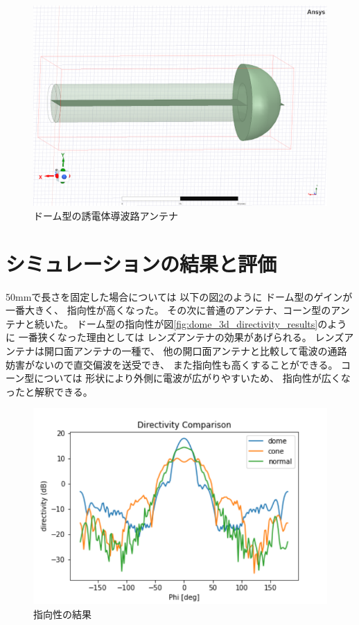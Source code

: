 \documentclass[technicalreport]{ieicej}
\begin{document}
\begin{figure}[tb]
  \begin{center}
    \includegraphics[bb=0 0 384 262, width=0.7\linewidth]{img/dome.pdf}
    \caption{ドーム型の誘電体導波路アンテナ}
    \label{fig:dome}
  \end{center}
\end{figure}

\section{シミュレーションの結果と評価}

50mmで長さを固定した場合については
以下の図\ref{fig:directivity_results}のように
ドーム型のゲインが一番大きく、
指向性が高くなった。
その次に普通のアンテナ、コーン型のアンテナと続いた。
ドーム型の指向性が図\ref{fig:dome_3d_directivity_results}のように
一番狭くなった理由としては
レンズアンテナの効果があげられる。
レンズアンテナは開口面アンテナの一種で、
他の開口面アンテナと比較して電波の通路妨害がないので直交偏波を送受でき、
また指向性も高くすることができる。
コーン型については
形状により外側に電波が広がりやすいため、
指向性が広くなったと解釈できる。

\begin{figure}[tb]
  \begin{center}
    \includegraphics[bb=0 0 324 216, width=1.0\linewidth]{img/directivity.pdf}
    \caption{指向性の結果}
    \label{fig:directivity_results}
  \end{center}
\end{figure}
\end{document}
